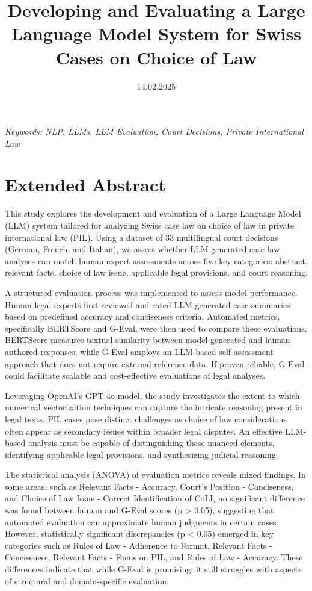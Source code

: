 \documentclass[a4paper,12pt]{article}
\title{Developing and Evaluating a Large Language Model System for Swiss Cases on Choice of Law}
\date{14.02.2025}
\begin{document}
\maketitle
\thispagestyle{fancy}

\begin{center}
\textit{Keywords: NLP, LLMs, LLM Evaluation, Court Decisions, Private International Law}
\newline
\end{center}

\section*{Extended Abstract}

This study explores the development and evaluation of a Large Language Model (LLM) system tailored for analyzing Swiss case law on choice of law in private international law (PIL). Using a dataset of 33 multilingual court decisions (German, French, and Italian), we assess whether LLM-generated case law analyses can match human expert assessments across five key categories: abstract, relevant facts, choice of law issue, applicable legal provisions, and court reasoning.

A structured evaluation process was implemented to assess model performance. Human legal experts first reviewed and rated LLM-generated case summaries based on predefined accuracy and conciseness criteria. Automated metrics, specifically BERTScore and G-Eval, were then used to compare these evaluations. BERTScore measures textual similarity between model-generated and human-authored responses, while G-Eval employs an LLM-based self-assessment approach that does not require external reference data. If proven reliable, G-Eval could facilitate scalable and cost-effective evaluations of legal analyses.

Leveraging OpenAI’s GPT-4o model, the study investigates the extent to which numerical vectorization techniques can capture the intricate reasoning present in legal texts. PIL cases pose distinct challenges as choice of law considerations often appear as secondary issues within broader legal disputes. An effective LLM-based analysis must be capable of distinguishing these nuanced elements, identifying applicable legal provisions, and synthesizing judicial reasoning.

The statistical analysis (ANOVA) of evaluation metrics reveals mixed findings. In some areas, such as Relevant Facts - Accuracy, Court’s Position - Conciseness, and Choice of Law Issue - Correct Identification of CoLI, no significant difference was found between human and G-Eval scores (p > 0.05), suggesting that automated evaluation can approximate human judgments in certain cases. However, statistically significant discrepancies (p < 0.05) emerged in key categories such as Rules of Law - Adherence to Format, Relevant Facts - Conciseness, Relevant Facts - Focus on PIL, and Rules of Law - Accuracy. These differences indicate that while G-Eval is promising, it still struggles with aspects of structural and domain-specific evaluation.
\end{document}
